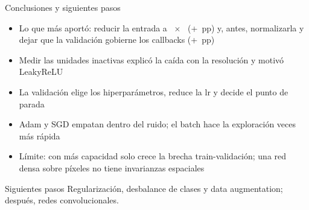 \begin{frame}{Conclusiones y siguientes pasos}
  \begin{itemize}
    \item Lo que más aportó: reducir la entrada a ~$\times$~ (+~pp) y, antes, normalizarla y dejar que la validación gobierne los callbacks (+~pp)
    \item Medir las unidades inactivas explicó la caída con la resolución y motivó LeakyReLU
    \item La validación elige los hiperparámetros, reduce la lr y decide el punto de parada
    \item Adam y SGD empatan dentro del ruido; el batch  hace la exploración  veces más rápida
    \item Límite: con más capacidad solo crece la brecha train-validación; una red densa sobre píxeles no tiene invarianzas espaciales
  \end{itemize}
  \vspace{0.2cm}
  \begin{alertblock}{Siguientes pasos}
    Regularización, desbalance de clases y data augmentation; después, redes convolucionales.
  \end{alertblock}
\end{frame}
